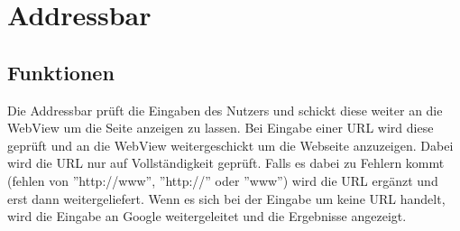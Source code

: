 \section{Addressbar}
\subsection{Funktionen}
Die Addressbar prüft die Eingaben des Nutzers und schickt diese weiter an die WebView um die Seite anzeigen zu lassen.
Bei Eingabe einer URL wird diese geprüft und an die WebView weitergeschickt um die Webseite anzuzeigen.
Dabei wird die URL nur auf Vollständigkeit geprüft. Falls es dabei zu Fehlern kommt (fehlen von ''http://www'', ''http://'' oder ''www'')
wird die URL ergänzt und erst dann weitergeliefert.
Wenn es sich bei der Eingabe um keine URL handelt, wird die Eingabe an Google weitergeleitet und die Ergebnisse angezeigt.


